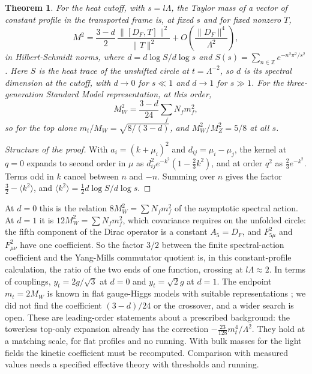 \documentclass[aps,prd,reprint,onecolumn,nofootinbib,amsmath,amssymb,floatfix]{revtex4-2}
\theoremstyle{plain}
\newtheorem{theorem}{Theorem}
\begin{document}
\begin{theorem}\label{thm:deff}
For the heat cutoff, with $s=l\Lambda$, the Taylor mass of a vector of constant profile in the transported frame is, at fixed $s$ and for fixed nonzero $T$,
\begin{equation}
M^2=\frac{3-d}2\,\frac{\|[D_F,T]\|^2}{\|T\|^2}+O\!\left(\frac{\|D_F\|^4}{\Lambda^2}\right),
\end{equation}
in Hilbert-Schmidt norms, where $d=d\log S/d\log s$ and $S(s)=\sum_{n\in\mathbb Z}e^{-n^2\pi^2/s^2}$. Here $S$ is the heat trace of the unshifted circle at $t=\Lambda^{-2}$, so $d$ is its spectral dimension at the cutoff, with $d\to0$ for $s\ll1$ and $d\to1$ for $s\gg1$. For the three-generation Standard Model representation, at this order,
\begin{equation}
M_W^2=\frac{3-d}{24}\sum_fN_fm_f^2,
\end{equation}
so for the top alone $m_t/M_W=\sqrt{8/(3-d)}$, and $M_W^2/M_Z^2=5/8$ at all $s$.
\end{theorem}

\begin{proof}[Structure of the proof]
With $a_i=(k+\mu_i)^2$ and $d_{ij}=\mu_i-\mu_j$, the kernel at $q=0$ expands to second order in $\mu$ as $d_{ij}^2e^{-k^2}(1-\tfrac23k^2)$, and at order $q^2$ as $\tfrac23e^{-k^2}$. Terms odd in $k$ cancel between $n$ and $-n$. Summing over $n$ gives the factor $\tfrac32-\langle k^2\rangle$, and $\langle k^2\rangle=\tfrac12d\log S/d\log s$.
\end{proof}

At $d=0$ this is the relation $8M_W^2=\sum N_fm_f^2$ of the asymptotic spectral action. At $d=1$ it is $12M_W^2=\sum N_fm_f^2$, which covariance requires on the unfolded circle: the fifth component of the Dirac operator is a constant $A_5=D_F$, and $F_{5\mu}^2$ and $F_{\mu\nu}^2$ have one coefficient. So the factor $3/2$ between the finite spectral-action coefficient and the Yang-Mills commutator quotient is, in this constant-profile calculation, the ratio of the two ends of one function, crossing at $l\Lambda\approx2$. In terms of couplings, $y_t=2g/\sqrt3$ at $d=0$ and $y_t=\sqrt2g$ at $d=1$. The endpoint $m_t=2M_W$ is known in flat gauge-Higgs models with suitable representations \cite{CCP2006}; we did not find the coefficient $(3-d)/24$ or the crossover, and a wider search is open. These are leading-order statements about a prescribed background: the towerless top-only expansion already has the correction $-\tfrac{23}{128}m_t^4/\Lambda^2$. They hold at a matching scale, for flat profiles and no running. With bulk masses for the light fields the kinetic coefficient must be recomputed. Comparison with measured values needs a specified effective theory with thresholds and running.
\end{document}
